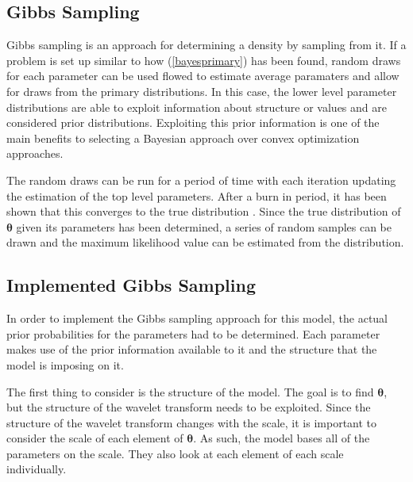 \documentclass{IEEEtran}
\begin{document}
\subsection{Gibbs Sampling}

Gibbs sampling is an approach for determining a density by sampling
from it.  If a problem is set up similar to how (\ref{bayesprimary})
has been found, random draws for each parameter can be used
flowed to estimate average paramaters and allow for draws from the primary distributions.  In this
case, the lower level parameter distributions are able to exploit information
about structure or values and are considered prior distributions.
Exploiting this prior information is one of the main benefits to selecting a Bayesian approach over
convex optimization approaches.  

The random draws can be run for a period of time with each iteration
updating the estimation of the top level parameters. After a burn in
period, it has been shown that this
converges to the true distribution \cite{Mackay03}.  Since the true
distribution of $\mathbf{\theta}$ given its parameters has been determined, a series of random samples can be drawn
and the maximum likelihood value can be estimated from the
distribution.

\subsection{Implemented Gibbs Sampling}

In order to implement the Gibbs sampling approach for this model, the
actual prior probabilities for the parameters had to be
determined. Each parameter makes use of the prior information
available to it and the structure that the model is imposing on it.

The first thing to consider is the structure of the model.  The
goal is to find $\mathbf{\theta}$, but the structure of the wavelet
transform needs to be exploited.  Since the structure of the wavelet
transform changes with the scale, it is important to consider the
scale of each element of $\mathbf{\theta}$.  As such, the model bases
all of the parameters on the scale.  They also look at each element of
each scale individually.  
\end{document}
